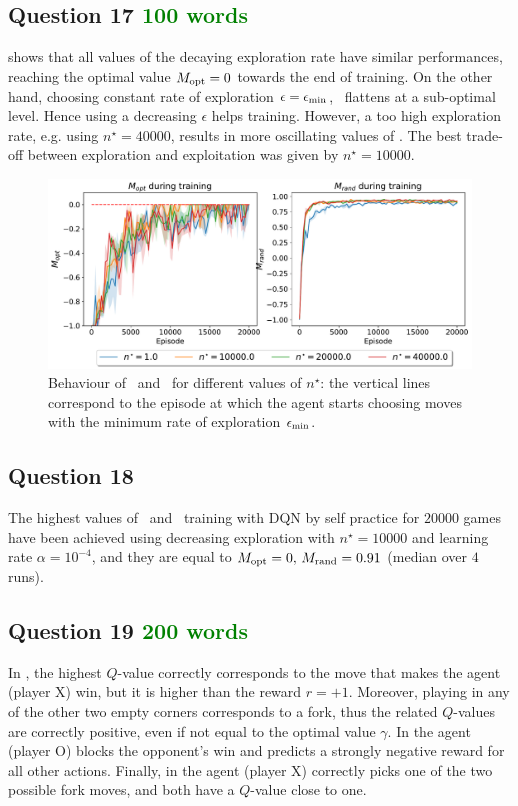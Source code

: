 \documentclass[10pt]{IEEEtran}
\begin{document}
\subsection*{Question 17  \textcolor{green}{100 words}}
 shows that all values of the decaying exploration rate have similar performances, reaching the optimal value $M_{\text{opt}} = 0$ towards the end of training. On the other hand, choosing constant rate of exploration $\epsilon = \epsilon_{\text{min}}$, \mrand \ flattens at a sub-optimal level. Hence using a decreasing $\epsilon$ helps training. However, a too high exploration rate, e.g. using $n^{\star} = 40000$, results in more oscillating values of \mopt. The best trade-off between exploration and exploitation was given by $n^{\star} = 10000$.    
\begin{figure}[h]
    \centering
    \includegraphics[width = \linewidth]{code/figures/performance_n_star_dqn_self.pdf}
    \caption{Behaviour of \mopt\ and \mrand\ for different values of $n^{\star}$: the vertical lines correspond to the episode at which the agent starts choosing moves with the minimum rate of exploration $\epsilon_{\text{min}}$.}
    \label{plot_question17}
\end{figure}

\subsection*{Question 18}
The highest values of \mopt\  and \mrand\  training with DQN by self practice for $20000$ games have been achieved using decreasing exploration with $n^{\star} = 10000$ and learning rate $\alpha = 10^{-4}$, and they are equal to $M_{\text{opt}} = 0, \, M_{\text{rand}} = 0.91$ (median over $4$ runs).

\subsection*{Question 19  \textcolor{green}{200 words}}
In , the highest $Q$-value correctly corresponds to the move that makes the agent (player X) win, but it is higher than the reward $r = +1$. Moreover, playing in any of the other two empty corners corresponds to a fork, thus the related $Q$-values are correctly positive, even if not equal to the optimal value $\gamma$. In  the agent (player O) blocks the opponent's win and predicts a strongly negative reward for all other actions. Finally, in  the agent (player X) correctly picks one of the two possible fork moves, and both have a $Q$-value close to one.
\end{document}
